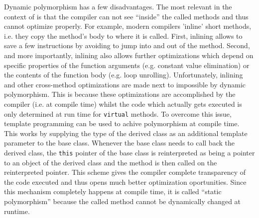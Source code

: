 Dynamic polymorphism has a few disadvantages. The most relevant in the
context of \eWoms is that the compiler can not see ``inside'' the
called methods and thus cannot optimize properly. For example, modern
\Cplusplus compilers 'inline' short methods, i.e. they copy the method's body
to where it is called. First, inlining allows to save a few
instructions by avoiding to jump into and out of the method. Second,
and more importantly, inlining also allows further optimizations which
depend on specific properties of the function arguments (e.g. constant
value elimination) or the contents of the function body (e.g. loop
unrolling). Unfortunately, inlining and other cross-method
optimizations are made next to impossible by dynamic
polymorphism. This is because these optimizations are accomplished by the
compiler (i.e. at compile time) whilst the code which actually gets
executed is only determined at run time for \texttt{virtual}
methods. To overcome this issue, template programming can be used to
achive polymorphism at compile time. This works by supplying the type
of the derived class as an additional template parameter to the base
class. Whenever the base class needs to call back the derived class, the \texttt{this} pointer of the base class is reinterpreted as
being a pointer to an object of the derived class and the method is
then called on the reinterpreted pointer. This scheme gives the \Cplusplus
compiler complete transparency of the code executed and thus opens
much better optimization oportunities. Since this mechanism completely
happens at compile time, it is called ``static polymorphism'' because
the called method cannot be dynamically changed at runtime.
